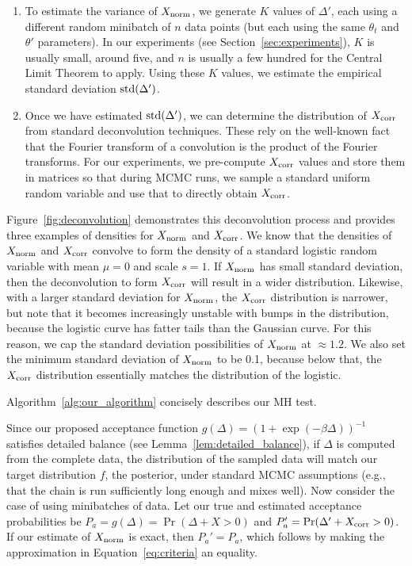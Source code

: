 \documentclass{article}
\begin{document}
\begin{enumerate}[noitemsep]
    \item To estimate the variance of $X_{\rm norm}$, we generate $K$ values of $\Delta'$, each
    using a different random minibatch of $n$ data points (but each using the same $\theta_t$ and
    $\theta'$ parameters). In our experiments (see Section~\ref{sec:experiments}), $K$ is usually
    small, around five, and $n$ is usually a few hundred for the Central Limit Theorem to apply.
    Using these $K$ values, we estimate the empirical standard deviation ${\rm std}(\Delta')$.

    \item Once we have estimated ${\rm std}(\Delta')$, we can determine the distribution of
    $X_{\rm corr}$ from standard deconvolution techniques. These rely on the well-known fact that
    the Fourier transform of a convolution is the product of the Fourier transforms. For our
    experiments, we pre-compute $X_{\rm corr}$ values and store them in matrices so that during MCMC
    runs, we sample a standard uniform random variable and use that to directly obtain $X_{\rm
    corr}$.
\end{enumerate}

Figure~\ref{fig:deconvolution} demonstrates this deconvolution process and provides three examples
of densities for $X_{\rm norm}$ and $X_{\rm corr}$. We know that the densities of $X_{\rm norm}$ and
$X_{\rm corr}$ convolve to form the density of a standard logistic random variable with mean $\mu=0$
and scale $s=1$. If $X_{\rm norm}$ has small standard deviation, then the deconvolution to form
$X_{\rm corr}$ will result in a wider distribution. Likewise, with a larger standard deviation for
$X_{\rm norm}$, the $X_{\rm corr}$ distribution is narrower, but note that it becomes increasingly
unstable with bumps in the distribution, because the logistic curve has fatter tails than the
Gaussian curve. For this reason, we cap the standard deviation possibilities of $X_{\rm norm}$ at
$\approx 1.2$. We also set the minimum standard deviation of $X_{\rm norm}$ to be 0.1, because below
that, the $X_{\rm corr}$ distribution essentially matches the distribution of the logistic.

Algorithm~\ref{alg:our_algorithm} concisely describes our MH test.

Since our proposed acceptance function $g(\Delta) = (1+ \exp(-\beta \Delta))^{-1}$ satisfies
detailed balance (see Lemma~\ref{lem:detailed_balance}), if $\Delta$ is computed from the complete
data, the distribution of the sampled data will match our target distribution $f$, the posterior,
under standard MCMC assumptions (e.g., that the chain is run sufficiently long enough and mixes
well). Now consider the case of using minibatches of data. Let our true and estimated acceptance
probabilities be $P_a = g(\Delta) = \Pr(\Delta + X > 0)$ and $P_a' = \Pr(\Delta' + X_{\rm corr} >
0)$.  If our estimate of $X_{\rm norm}$ is exact, then $P_a' = P_a$, which follows by making the
approximation in Equation~\ref{eq:criteria} an equality.
\end{document}
